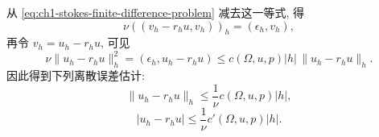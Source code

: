 从 \eqref{eq:ch1-stokes-finite-difference-problem} 减去这一等式, 得
\begin{equation}
\nu((v_h-r_hu,v_h))_h=(\epsilon_h,v_h),
\label{eq:ch1-discrete-error-equation}
\end{equation}
再令 $v_h=u_h-r_hu$, 可见
\[
\nu\|u_h-r_hu\|_h^2
=(\epsilon_h,u_h-r_hu)
\leq c(\Omega,u,p)|h|\,\|u_h-r_hu\|_h.
\]
因此得到下列离散误差估计:
\begin{equation}
\|u_h-r_hu\|_h\leq\frac1\nu c(\Omega,u,p)|h|,
\label{eq:ch1-discrete-error-h1-estimate}
\end{equation}
\begin{equation}
|u_h-r_hu|\leq\frac1\nu c'(\Omega,u,p)|h|.
\label{eq:ch1-discrete-error-l2-estimate}
\end{equation}
